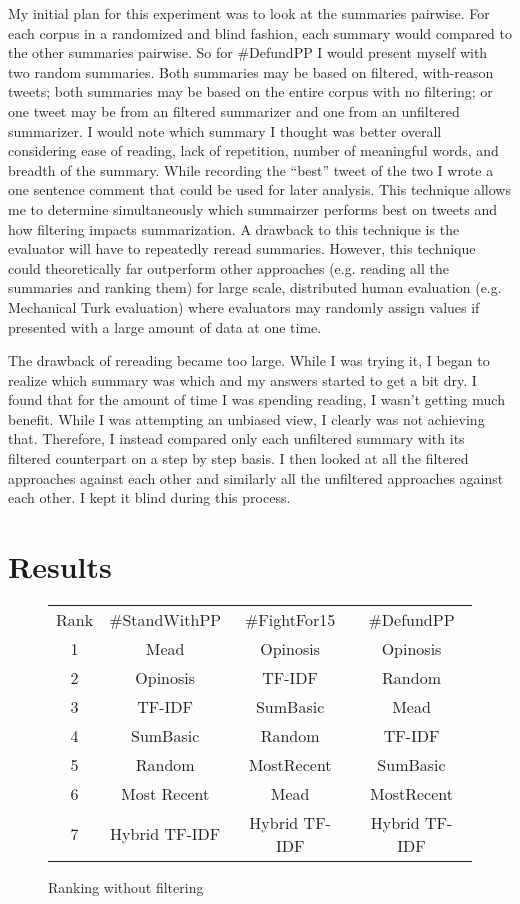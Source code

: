 \documentclass[paper=letter, fontsize=12pt]{article}
\begin{document}
My initial plan for this experiment was to look at the summaries pairwise. For each corpus in a randomized and blind fashion, each summary would compared to the other summaries pairwise. So for \#DefundPP I would present myself with two random summaries. Both summaries may be based on filtered, with-reason tweets; both summaries may be based on the entire corpus with no filtering; or one tweet may be from an filtered summarizer and one from an unfiltered summarizer. I would note which summary I thought was better overall considering ease of reading, lack of repetition, number of meaningful words, and breadth of the summary. While recording the ``best'' tweet of the two I wrote a one sentence comment that could be used for later analysis. This technique allows me to determine simultaneously which summairzer performs best on tweets and how filtering impacts summarization. A drawback to this technique is the evaluator will have to repeatedly reread summaries. However, this technique could theoretically far outperform other approaches (e.g. reading all the summaries and ranking them) for large scale, distributed human evaluation (e.g. Mechanical Turk evaluation) where evaluators may randomly assign values if presented with a large amount of data at one time.

The drawback of rereading became too large. While I was trying it, I began to realize which summary was which and my answers started to get a bit dry. I found that for the amount of time I was spending reading, I wasn't getting much benefit. While I was attempting an unbiased view, I clearly was not achieving that. Therefore, I instead compared only each unfiltered summary with its filtered counterpart on a step by step basis. I then looked at all the filtered approaches against each other and similarly all the unfiltered approaches against each other. I kept it blind during this process. 

\section{Results}
\begin{figure}[h]
\begin{center}
\begin{tabular}{ |c||c|c|c| } 
 \hline
  Rank & \#StandWithPP &\#FightFor15 & \#DefundPP \\
  1 & Mead &  Opinosis & Opinosis \\
  2 & Opinosis & TF-IDF & Random\\
  3 & TF-IDF & SumBasic & Mead \\
  4 & SumBasic & Random & TF-IDF\\
  5 & Random & MostRecent & SumBasic\\
  6 & Most Recent & Mead & MostRecent\\
  7 & Hybrid TF-IDF & Hybrid TF-IDF & Hybrid TF-IDF\\
 \hline
\end{tabular}
\end{center}
\caption{Ranking without filtering}
\end{figure}
\end{document}
